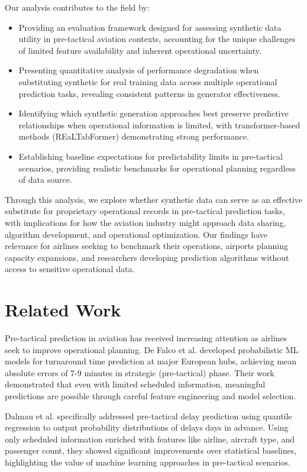 \documentclass[conference]{IEEEtran}
\begin{document}
Our analysis contributes to the field by:
\begin{itemize}
    \item Providing an evaluation framework designed for assessing synthetic data utility in pre-tactical aviation contexts, accounting for the unique challenges of limited feature availability and inherent operational uncertainty.
    \item Presenting quantitative analysis of performance degradation when substituting synthetic for real training data across multiple operational prediction tasks, revealing consistent patterns in generator effectiveness.
    \item Identifying which synthetic generation approaches best preserve predictive relationships when operational information is limited, with transformer-based methods (REaLTabFormer) demonstrating strong performance.
    \item Establishing baseline expectations for predictability limits in pre-tactical scenarios, providing realistic benchmarks for operational planning regardless of data source.
\end{itemize}

Through this analysis, we explore whether synthetic data can serve as an effective substitute for proprietary operational records in pre-tactical prediction tasks, with implications for how the aviation industry might approach data sharing, algorithm development, and operational optimization. Our findings have relevance for airlines seeking to benchmark their operations, airports planning capacity expansions, and researchers developing prediction algorithms without access to sensitive operational data.

\section{Related Work}

Pre-tactical prediction in aviation has received increasing attention as airlines seek to improve operational planning. De Falco et al.  \cite{de2023probabilistic} developed probabilistic ML models for turnaround time prediction at major European hubs, achieving mean absolute errors of 7-9 minutes in strategic (pre-tactical) phase. Their work demonstrated that even with limited scheduled information, meaningful predictions are possible through careful feature engineering and model selection.

Dalmau et al. \cite{dalmau2024probabilistic} specifically addressed pre-tactical delay prediction using quantile regression to output probability distributions of delays days in advance. Using only scheduled information enriched with features like airline, aircraft type, and passenger count, they showed significant improvements over statistical baselines, highlighting the value of machine learning approaches in pre-tactical scenarios.
\end{document}
